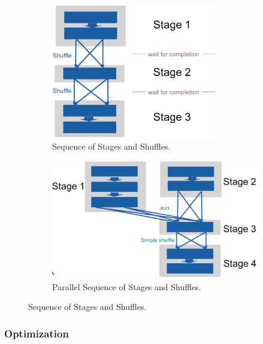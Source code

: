 \begin{figure}[h]
    \centering
    \begin{subfigure}{0.47\textwidth}
        \centering
        \includegraphics[width=0.8\textwidth]{Figures/StageShuffleSequence.jpeg}
        \caption{Sequence of Stages and Shuffles.}\label{subfig:stageshuffleseq}
    \end{subfigure}
    \hfill
    \begin{subfigure}{0.48\textwidth}
        \centering
        \includegraphics[width=\textwidth]{Figures/ParellelStageShuffleSeq.jpeg}
        \caption{Parallel Sequence of Stages and Shuffles.}\label{subfig:parallStageShuffleSeq}
    \end{subfigure}
    \caption{Sequence of Stages and Shuffles.}
\end{figure}

\subsubsection{Optimization}


